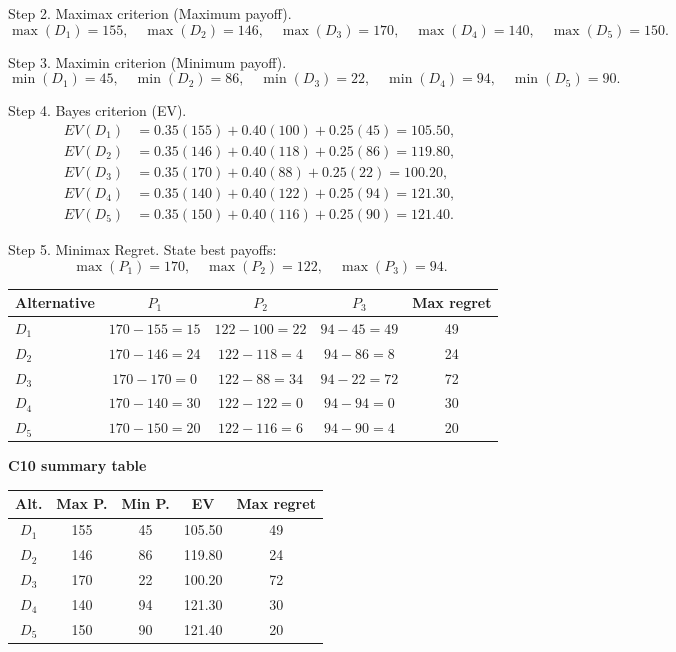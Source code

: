 \begin{ExamProblems}
		Step 2. Maximax criterion (Maximum payoff).
		\[
		\max(D_1)=155,\quad \max(D_2)=146,\quad \max(D_3)=170,\quad \max(D_4)=140,\quad \max(D_5)=150.
		\]

		Step 3. Maximin criterion (Minimum payoff).
		\[
		\min(D_1)=45,\quad \min(D_2)=86,\quad \min(D_3)=22,\quad \min(D_4)=94,\quad \min(D_5)=90.
		\]

		Step 4. Bayes criterion (EV).
		\[
		\begin{aligned}
		EV(D_1)&=0.35(155)+0.40(100)+0.25(45)=105.50,\\
		EV(D_2)&=0.35(146)+0.40(118)+0.25(86)=119.80,\\
		EV(D_3)&=0.35(170)+0.40(88)+0.25(22)=100.20,\\
		EV(D_4)&=0.35(140)+0.40(122)+0.25(94)=121.30,\\
		EV(D_5)&=0.35(150)+0.40(116)+0.25(90)=121.40.
		\end{aligned}
		\]

		Step 5. Minimax Regret.
		State best payoffs:
		\[
		\max(P_1)=170,\quad \max(P_2)=122,\quad \max(P_3)=94.
		\]
		\begin{center}
			\begin{tabular}{l c c c c}
				\toprule
				Alternative & $P_1$ & $P_2$ & $P_3$ & Max regret \\
				\midrule
				$D_1$ & $170-155=15$ & $122-100=22$ & $94-45=49$ & 49 \\
				$D_2$ & $170-146=24$ & $122-118=4$ & $94-86=8$ & 24 \\
				$D_3$ & $170-170=0$ & $122-88=34$ & $94-22=72$ & 72 \\
				$D_4$ & $170-140=30$ & $122-122=0$ & $94-94=0$ & 30 \\
				$D_5$ & $170-150=20$ & $122-116=6$ & $94-90=4$ & 20 \\
				\bottomrule
			\end{tabular}
		\end{center}

		\textbf{C10 summary table}
		\begin{center}
			\begin{tabular}{c c c c c}
				\toprule
				Alt. & Max P. & Min P. & EV & Max regret \\
				\midrule
				$D_1$ & 155 & 45 & 105.50 & 49 \\
				$D_2$ & 146 & 86 & 119.80 & 24 \\
				$D_3$ & 170 & 22 & 100.20 & 72 \\
				$D_4$ & 140 & 94 & 121.30 & 30 \\
				$D_5$ & 150 & 90 & 121.40 & 20 \\
				\bottomrule
			\end{tabular}
		\end{center}


\end{ExamProblems}
